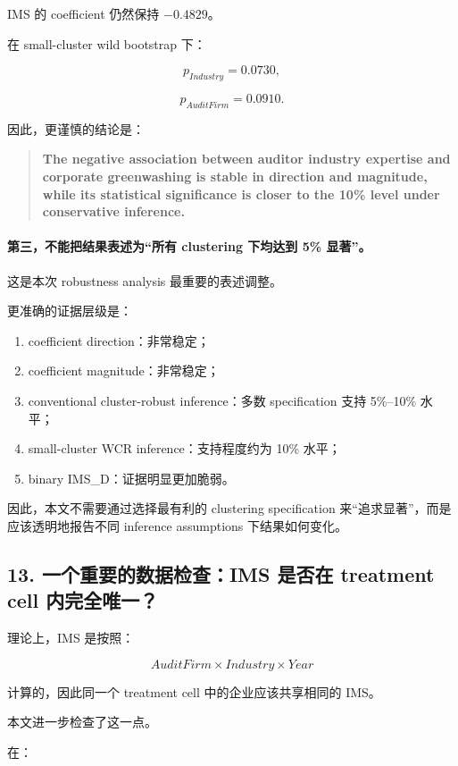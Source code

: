 \documentclass[11pt]{article}
\begin{document}
IMS 的 coefficient 仍然保持 $-0.4829$。

在 small-cluster wild bootstrap 下：

\[
p_{Industry}=0.0730,
\]

\[
p_{AuditFirm}=0.0910.
\]

因此，更谨慎的结论是：

\begin{quote}
\textbf{The negative association between auditor industry expertise and corporate greenwashing is stable in direction and magnitude, while its statistical significance is closer to the 10\% level under conservative inference.}
\end{quote}

\paragraph{第三，不能把结果表述为“所有 clustering 下均达到 5\% 显著”。}

这是本次 robustness analysis 最重要的表述调整。

更准确的证据层级是：

\begin{enumerate}
    \item coefficient direction：非常稳定；
    \item coefficient magnitude：非常稳定；
    \item conventional cluster-robust inference：多数 specification 支持 5\%--10\% 水平；
    \item small-cluster WCR inference：支持程度约为 10\% 水平；
    \item binary IMS\_D：证据明显更加脆弱。
\end{enumerate}

因此，本文不需要通过选择最有利的 clustering specification 来“追求显著”，而是应该透明地报告不同 inference assumptions 下结果如何变化。

\subsection{13. 一个重要的数据检查：IMS 是否在 treatment cell 内完全唯一？}

理论上，IMS 是按照：

\[
AuditFirm \times Industry \times Year
\]

计算的，因此同一个 treatment cell 中的企业应该共享相同的 IMS。

本文进一步检查了这一点。

在：
\end{document}
